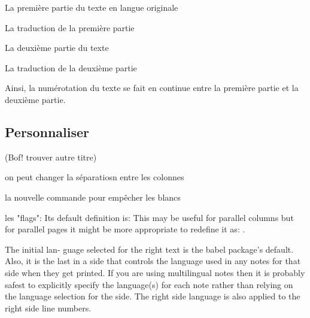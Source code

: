 \begin{latexcode*}
\begin{pages}  
	\begin{Leftside}  \beginnumbering 
La première partie du texte en langue originale
 \end{Leftside} %
 
\begin{Rightside} \beginnumbering
La traduction de la première partie
 \end{Rightside} %
 \Pages
 
	\begin{Leftside} \memorydump %
La deuxième partie du texte 
	\endnumbering  \end{Leftside}
	
	\begin{Rightside}  \memorydump %
La traduction de la deuxième partie
	\endnumbering \end{Rightside}   %
 
 \Pages

  \end{pages}
\end{latexcode*}

Ainsi, la numérotation du texte se fait en continue entre la première partie et la deuxième partie.







\subsection{Personnaliser}


(Bof! trouver autre titre)



on peut changer la séparatiosn entre les colonnes

la nouvelle commande pour empêcher les blancs

les "flags": Its default definition is: \newcommand*{\Rlineflag}{R} This may be useful for parallel columns but for parallel pages it might be more appropriate to redefine it as:
\renewcommand*{\Rlineflag}{}.

The initial lan- guage selected for the right text is the babel package’s default. Also, it is the last \selectlanguage in a side that controls the language used in any notes for that
side when they get printed. If you are using multilingual notes then it is probably safest to explicitly specify the language(s) for each note rather than relying on the language selection for the side. The right side language is also applied to the right side line numbers.
